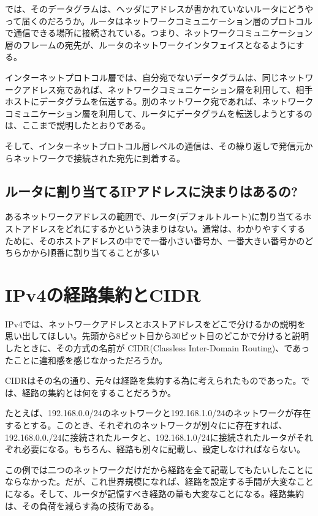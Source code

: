では、そのデータグラムは、ヘッダにアドレスが書かれていないルータにどうやって届くのだろうか。ルータはネットワークコミュニケーション層のプロトコルで通信できる場所に接続されている。つまり、ネットワークコミュニケーション層のフレームの宛先が、ルータのネットワークインタフェイスとなるようにする。

インターネットプロトコル層では、自分宛でないデータグラムは、同じネットワークアドレス宛であれば、ネットワークコミュニケーション層を利用して、相手ホストにデータグラムを伝送する。別のネットワーク宛であれば、ネットワークコミュニケーション層を利用して、ルータにデータグラムを転送しようとするのは、ここまで説明したとおりである。

そして、インターネットプロトコル層レベルの通信は、その繰り返しで発信元からネットワークで接続された宛先に到着する。


\subsection{ルータに割り当てるIPアドレスに決まりはあるの?}
あるネットワークアドレスの範囲で、ルータ(デフォルトルート)に割り当てるホストアドレスをどれにするかという決まりはない。通常は、わかりやすくするために、そのホストアドレスの中でで一番小さい番号か、一番大きい番号かのどちらかから順番に割り当てることが多い

\section{IPv4の経路集約とCIDR}

IPv4では、ネットワークアドレスとホストアドレスをどこで分けるかの説明を思い出してほしい。先頭から8ビット目から30ビット目のどこかで分けると説明したときに、その方式の名前が CIDR(Classless Inter-Domain Routing)、であったことに違和感を感じなかっただろうか。

CIDRはその名の通り、元々は経路を集約する為に考えられたものであった。では、経路の集約とは何をすることだろうか。

たとえば、192.168.0.0/24のネットワークと192.168.1.0/24のネットワークが存在するとする。このとき、それぞれのネットワークが別々にに存在すれば、192.168.0.0./24に接続されたルータと、192.168.1.0/24に接続されたルータがそれぞれ必要になる。もちろん、経路も別々に記載し、設定しなければならない。

この例では二つのネットワークだけだから経路を全て記載してもたいしたことにならなかった。だが、これ世界規模になれば、経路を設定する手間が大変なことになる。そして、ルータが記憶すべき経路の量も大変なことになる。経路集約は、その負荷を減らす為の技術である。

